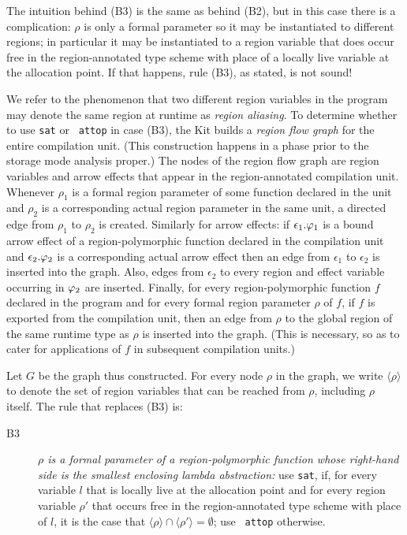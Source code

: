 \documentclass[12pt]{book}
\begin{document}
The intuition behind (B3) is the same as behind (B2), but in this case
there is a complication: $\rho$ is only a formal parameter so it may
be instantiated to different regions; in particular it may be
instantiated to a region variable that does occur free in the
region-annotated type scheme with place of a locally live variable at
the allocation point. If that happens, rule (B3), as stated, is not
sound!

We refer to the phenomenon that two different region variables in the
program may denote the same region at runtime as
%
{\em region aliasing}. To determine whether to use {\tt sat} or {\tt
  attop} in case (B3), the Kit builds a
%
\label{region flow graph}%
{\em region flow graph\/} for the entire compilation unit. (This
construction happens in a phase prior to the storage mode analysis
proper.)  The nodes of the region flow graph are region variables and
arrow effects that appear in the region-annotated compilation unit.
Whenever $\rho_1$ is a formal region parameter of some function
declared in the unit and $\rho_2$ is a corresponding actual region
parameter in the same unit, a directed edge from $\rho_1$ to $\rho_2$
is created. Similarly for arrow effects: if $\epsilon_1.\varphi_1$ is a
bound arrow effect of a region-polymorphic function declared in the
compilation unit and $\epsilon_2.\varphi_2$ is a corresponding actual
arrow effect then an edge from $\epsilon_1$ to $\epsilon_2$ is
inserted into the graph.  Also, edges from $\epsilon_2$ to every
region and effect variable occurring in $\varphi_2$ are inserted.
Finally, for every region-polymorphic function $f$ declared in the
program and for every formal region parameter $\rho$ of $f$, if $f$ is
exported from the compilation unit, then an edge from $\rho$ to the
global region of the same runtime type as $\rho$ is inserted into the
graph. (This is necessary, so as to cater for applications of $f$ in
subsequent compilation units.)  

Let $G$ be the graph thus constructed.  For every node $\rho$ in the
graph, we write $\langle\rho\rangle$ to denote the set of region
variables that can be reached from $\rho$, including $\rho$ itself.
The rule that replaces (B3) is:
%
\begin{description}
\item[B3]{\it $\rho$ is a formal parameter of a region-polymorphic
    function whose right-hand side is the smallest enclosing lambda
    abstraction:} use {\tt sat}, if, for every variable $l$ that is
  locally live at the allocation point and for every region variable
  $\rho'$ that occurs free in the region-annotated type scheme with
  place of $l$, it is the case that
  $\langle\rho\rangle\cap\langle\rho'\rangle =\emptyset$; use {\tt
    attop} otherwise.
\end{description}
\medskip
\end{document}
